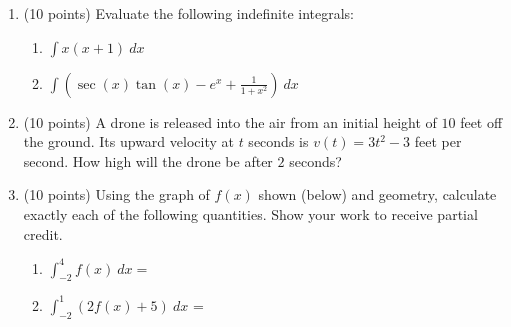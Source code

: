 \documentclass[12pt]{article}
\renewcommand{\d}{\displaystyle}
\newcommand{\ds}{\displaystyle}
\let\ds\displaystyle
\begin{document}
\begin{enumerate}
\vfill

\item (10 points)  Evaluate the following indefinite integrals:

\begin{enumerate}
\item $\ds \int x(x+1)\:dx$
\vfill
\item $\ds \int \left(\sec(x)\tan(x) - e^x + \frac{1}{{1+x^2}}\right)\:dx$
\vfill
\end{enumerate}

\newpage
\item (10 points) A drone is released into the air from an initial height of $10$ feet off the ground. Its upward velocity at $t$ seconds is $v(t) = 3t^2 - 3$ feet per second. How high will the drone be after $2$ seconds?
\vfill

\item (10 points) Using the graph of $f(x)$ shown (below) and  geometry, calculate exactly each of the following quantities. Show your work to receive partial credit.



\begin{enumerate}
\item $\d \int_{-2}^{4} f(x) \ dx =$ 
\vspace{.5in}

\item $\d \int_{-2}^1 (2 f(x)+5) \ dx$ =
\vspace{.5in}

\end{enumerate}


\end{enumerate}
\end{document}
